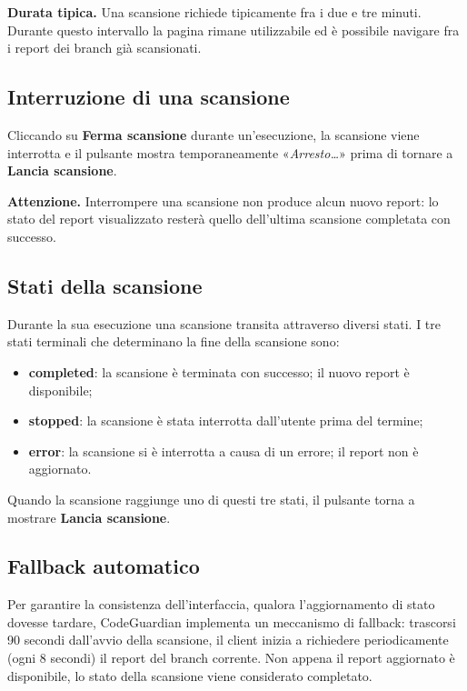 \documentclass[a4paper, 11pt]{article}
\begin{document}
\begin{infobox}
\textbf{Durata tipica.} Una scansione richiede tipicamente fra i due e tre minuti. Durante questo intervallo la pagina rimane utilizzabile ed è possibile navigare fra i report dei branch già scansionati.
\end{infobox}

\subsection{Interruzione di una scansione}
Cliccando su \textbf{Ferma scansione} durante un'esecuzione, la scansione viene interrotta e il pulsante mostra temporaneamente «\textit{Arresto\ldots}» prima di tornare a \textbf{Lancia scansione}.

\begin{warnbox}
\textbf{Attenzione.} Interrompere una scansione non produce alcun nuovo report: lo stato del report visualizzato resterà quello dell'ultima scansione completata con successo.
\end{warnbox}

\subsection{Stati della scansione}
Durante la sua esecuzione una scansione transita attraverso diversi stati. I tre stati terminali che determinano la fine della scansione sono:
\begin{itemize}
    \item \textbf{completed}: la scansione è terminata con successo; il nuovo report è disponibile;
    \item \textbf{stopped}: la scansione è stata interrotta dall'utente prima del termine;
    \item \textbf{error}: la scansione si è interrotta a causa di un errore; il report non è aggiornato.
\end{itemize}

\noindent Quando la scansione raggiunge uno di questi tre stati, il pulsante torna a mostrare \textbf{Lancia scansione}.

\subsection{Fallback automatico}
Per garantire la consistenza dell'interfaccia, qualora l'aggiornamento di stato dovesse tardare, CodeGuardian implementa un meccanismo di fallback: trascorsi 90 secondi dall'avvio della scansione, il client inizia a richiedere periodicamente (ogni 8 secondi) il report del branch corrente. Non appena il report aggiornato è disponibile, lo stato della scansione viene considerato completato.
\end{document}
